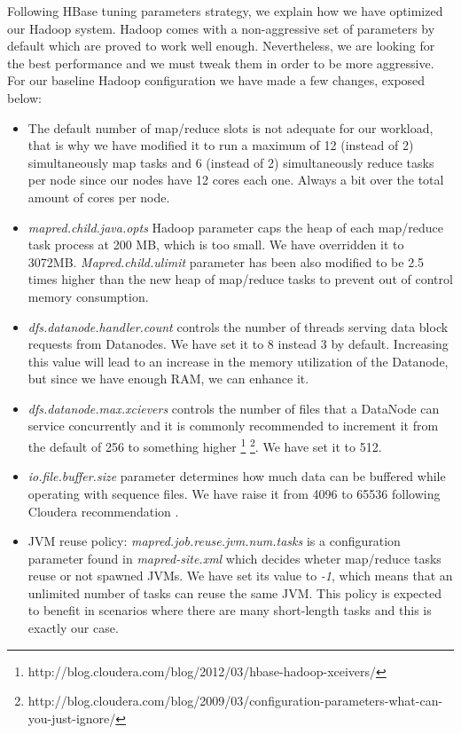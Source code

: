 Following HBase tuning parameters strategy, we explain how we have optimized our Hadoop system. Hadoop comes with a non-aggressive set of parameters by default which are proved to work well enough. Nevertheless, we are looking for the best performance and we must tweak them in order to be more aggressive. For our baseline Hadoop configuration we have made a few changes, exposed below: 
\begin{itemize}
\item The default number of map/reduce slots is not adequate for our workload, that is why we have modified it to run a maximum of 12 (instead of 2) simultaneously map tasks and 6 (instead of 2) simultaneously reduce tasks per node since our nodes have 12 cores each one. Always a bit over the total amount of cores per node.
\item \textit{mapred.child.java.opts} Hadoop parameter caps the heap of each map/reduce task process at 200 MB, which is too small. We have overridden it to 3072MB. \textit{Mapred.child.ulimit} parameter has been also modified to be 2.5 times higher than the new heap of map/reduce tasks to prevent out of control memory consumption.
\item \textit{dfs.datanode.handler.count} controls the number of threads serving data block requests from Datanodes. We have set it to 8 instead 3 by default. Increasing this value will lead to an increase in the memory utilization of the Datanode, but since we have enough RAM, we can enhance it.
\item \textit{dfs.datanode.max.xcievers} controls the number of files that a DataNode can service concurrently and it is commonly recommended to increment it from the default of 256 to something higher \footnote{http://blog.cloudera.com/blog/2012/03/hbase-hadoop-xceivers/}  \footnote{\label{1}http://blog.cloudera.com/blog/2009/03/configuration-parameters-what-can-you-just-ignore/}. We have set it to 512.
\item \textit{io.file.buffer.size} parameter determines how much data can be buffered while operating with sequence files. We have raise it from 4096 to 65536 following Cloudera recommendation \footnotemark[4].
\item JVM reuse policy: \textit{mapred.job.reuse.jvm.num.tasks} is a configuration parameter found in \textit{mapred-site.xml} which decides wheter map/reduce tasks reuse or not spawned JVMs. We have set its value to \textit{-1}, which means that an unlimited number of tasks can reuse the same JVM. This policy is expected to benefit in scenarios where there are many short-length tasks and this is exactly our case.
\end{itemize}



